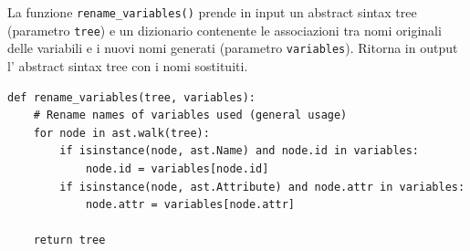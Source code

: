 \documentclass[a4paper,oneside,openright,titlepage,10pt,footinclude,headinclude]{scrbook}
\begin{document}
La funzione \texttt{rename\_variables()} prende in input un abstract sintax tree (parametro \texttt{tree}) e un dizionario contenente le associazioni tra nomi originali delle variabili  e i nuovi nomi generati (parametro \texttt{variables}). Ritorna in output l' abstract sintax tree con i nomi sostituiti.
\begin{graybox}[innerleftmargin=2,]
\begin{lstlisting}
def rename_variables(tree, variables):
    # Rename names of variables used (general usage)
    for node in ast.walk(tree):
        if isinstance(node, ast.Name) and node.id in variables:
            node.id = variables[node.id]
        if isinstance(node, ast.Attribute) and node.attr in variables:
            node.attr = variables[node.attr]

    return tree
\end{lstlisting}
\end{graybox}
\end{document}
